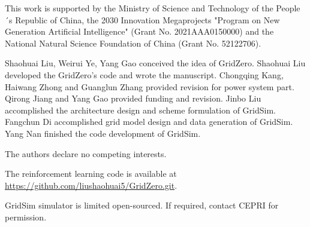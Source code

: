\documentclass[pdflatex,sn-mathphys]{sn-jnl}%
\theoremstyle{thmstyleone}%
\theoremstyle{thmstyletwo}%
\theoremstyle{thmstylethree}%
\begin{document}




























































\backmatter






This work is supported by the Ministry of Science and Technology of the People´s Republic of China, the 2030 Innovation Megaprojects "Program on New Generation Artificial Intelligence" (Grant No. 2021AAA0150000) and the National Natural Science Foundation of China (Grant No. 52122706).

Shaohuai Liu, Weirui Ye, Yang Gao conceived the idea of GridZero. Shaohuai Liu developed the GridZero's code and wrote the manuscript. Chongqing Kang, Haiwang Zhong and Guanglun Zhang provided revision for power system part. Qirong Jiang and Yang Gao provided funding and revision. Jinbo Liu accomplished the architecture design and scheme formulation of GridSim. Fangchun Di accomplished grid model design and data generation of GridSim. Yang Nan finished the code development of GridSim. 

The authors declare no competing interests.


The reinforcement learning code is available at \url{https://github.com/liushaohuai5/GridZero.git}.

 GridSim simulator is limited open-sourced. If required, contact CEPRI for permission.












%

\newpage

\end{document}
